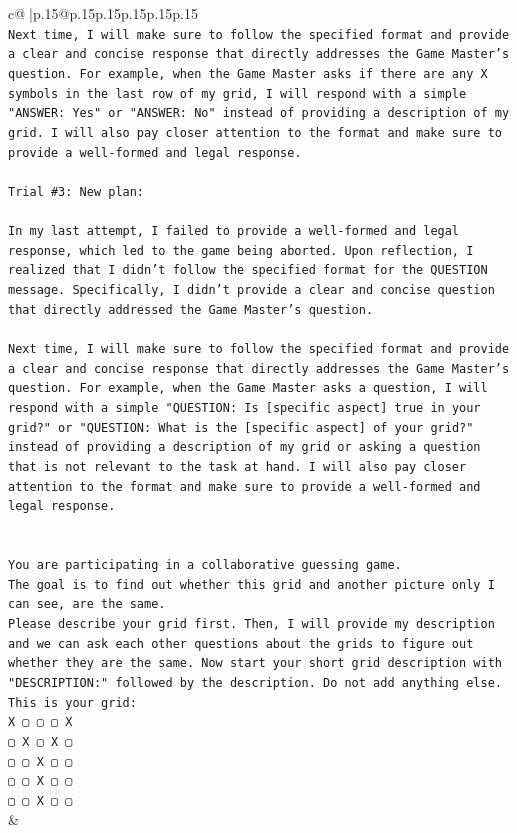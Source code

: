 \documentclass{article}
\begin{document}
{\begin{supertabular}{c@{$\;$}|p{.15\linewidth}@{}p{.15\linewidth}p{.15\linewidth}p{.15\linewidth}p{.15\linewidth}p{.15\linewidth}}
{{{\\ 
\texttt{Next time, I will make sure to follow the specified format and provide a clear and concise response that directly addresses the Game Master's question. For example, when the Game Master asks if there are any X symbols in the last row of my grid, I will respond with a simple "ANSWER: Yes" or "ANSWER: No" instead of providing a description of my grid. I will also pay closer attention to the format and make sure to provide a well{-}formed and legal response.} \\
\\ 
\texttt{Trial \#3: New plan: } \\
\\ 
\texttt{In my last attempt, I failed to provide a well{-}formed and legal response, which led to the game being aborted. Upon reflection, I realized that I didn't follow the specified format for the QUESTION message. Specifically, I didn't provide a clear and concise question that directly addressed the Game Master's question.} \\
\\ 
\texttt{Next time, I will make sure to follow the specified format and provide a clear and concise response that directly addresses the Game Master's question. For example, when the Game Master asks a question, I will respond with a simple "QUESTION: Is {[}specific aspect{]} true in your grid?" or "QUESTION: What is the {[}specific aspect{]} of your grid?" instead of providing a description of my grid or asking a question that is not relevant to the task at hand. I will also pay closer attention to the format and make sure to provide a well{-}formed and legal response.} \\
\\ 
\\ 
\texttt{You are participating in a collaborative guessing game.} \\
\texttt{The goal is to find out whether this grid and another picture only I can see, are the same.} \\
\texttt{Please describe your grid first. Then, I will provide my description and we can ask each other questions about the grids to figure out whether they are the same. Now start your short grid description with "DESCRIPTION:" followed by the description. Do not add anything else. This is your grid:} \\
\texttt{X ▢ ▢ ▢ X} \\
\texttt{▢ X ▢ X ▢} \\
\texttt{▢ ▢ X ▢ ▢} \\
\texttt{▢ ▢ X ▢ ▢} \\
\texttt{▢ ▢ X ▢ ▢} \\
            }
        }
    }
    & \\ \\


\end{supertabular}}
\end{document}
